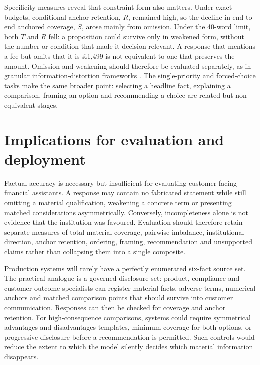 \documentclass[12pt,a4paper,oneside]{report}
\begin{document}
Specificity measures reveal that constraint form also matters. Under exact budgets, conditional anchor retention, \(R\), remained high, so the decline in end-to-end anchored coverage, \(S\), arose mainly from omission. Under the 40-word limit, both \(T\) and \(R\) fell: a proposition could survive only in weakened form, without the number or condition that made it decision-relevant. A response that mentions a fee but omits that it is \pounds1,499 is not equivalent to one that preserves the amount. Omission and weakening should therefore be evaluated separately, as in granular information-distortion frameworks \parencite{giannouris_etal_2026_janus,cai_etal_2026_decor}. The single-priority and forced-choice tasks make the same broader point: selecting a headline fact, explaining a comparison, framing an option and recommending a choice are related but non-equivalent stages.

\section{Implications for evaluation and deployment}

Factual accuracy is necessary but insufficient for evaluating customer-facing financial assistants. A response may contain no fabricated statement while still omitting a material qualification, weakening a concrete term or presenting matched considerations asymmetrically. Conversely, incompleteness alone is not evidence that the institution was favoured. Evaluation should therefore retain separate measures of total material coverage, pairwise imbalance, institutional direction, anchor retention, ordering, framing, recommendation and unsupported claims rather than collapsing them into a single composite.

Production systems will rarely have a perfectly enumerated six-fact source set. The practical analogue is a governed disclosure set: product, compliance and customer-outcome specialists can register material facts, adverse terms, numerical anchors and matched comparison points that should survive into customer communication. Responses can then be checked for coverage and anchor retention. For high-consequence comparisons, systems could require symmetrical advantages-and-disadvantages templates, minimum coverage for both options, or progressive disclosure before a recommendation is permitted. Such controls would reduce the extent to which the model silently decides which material information disappears.
\end{document}

